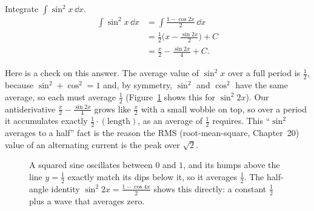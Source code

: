 \begin{example}
\label{ch24:ex-even}
Integrate $\displaystyle \int \sin^2 x\,\dd x.$
\begin{align*}
\int \sin^2 x\,\dd x
&= \int \frac{1 - \cos 2x}{2}\,\dd x\\
&= \frac{1}{2}\Big(x - \frac{\sin 2x}{2}\Big) + C\\
&= \frac{x}{2} - \frac{\sin 2x}{4} + C.
\end{align*}
\end{example}

\begin{intuitionbox}
Here is a check on this answer. The average value of $\sin^2 x$ over a full
period is $\tfrac{1}{2}$, because $\sin^2 + \cos^2 = 1$ and, by symmetry,
$\sin^2$ and $\cos^2$ have the same average, so each must average
$\tfrac{1}{2}$ (Figure~\ref{ch24:fig-sin2} shows this for $\sin^2 2x$). Our
antiderivative $\tfrac{x}{2} - \tfrac{\sin 2x}{4}$ grows like $\tfrac{x}{2}$
with a small wobble on top, so over a period it accumulates exactly
$\tfrac{1}{2}\cdot(\text{length})$, as an average of $\tfrac12$ requires. This
``$\sin^2$ averages to a half'' fact is the reason the RMS (root-mean-square,
Chapter~20) value of an alternating current is the peak over $\sqrt 2$.
\end{intuitionbox}

\begin{figure}[htbp]
\centering
{}
\caption{A squared sine oscillates between $0$ and $1$, and its humps above
the line $y=\tfrac12$ exactly match its dips below it, so it averages $\tfrac12$. The
half-angle identity $\sin^2 2x = \tfrac{1-\cos 4x}{2}$ shows this directly: a
constant $\tfrac12$ plus a wave that averages zero.}
\label{ch24:fig-sin2}
\end{figure}

